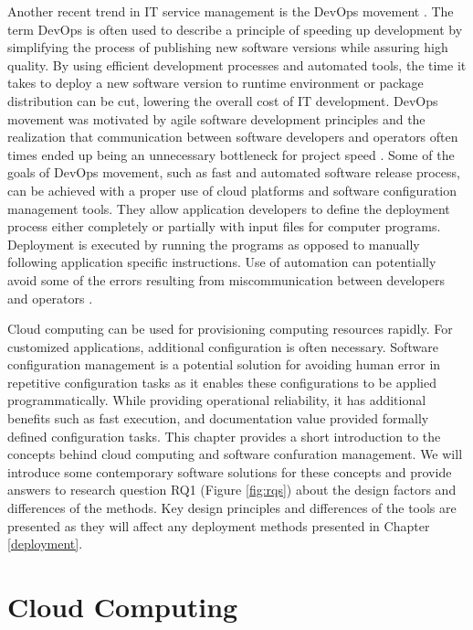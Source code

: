 Another recent trend in IT service management is the DevOps movement
\cite{wiedemann2019devops}. The term DevOps is often used to describe a
principle of speeding up development by simplifying the process of publishing
new software versions while assuring high quality. By using efficient
development processes and automated tools, the time it takes to deploy a new
software version to runtime environment or package distribution can be cut,
lowering the overall cost of IT development. DevOps movement was motivated by
agile software development principles and the realization that communication
between software developers and operators often times ended up being an
unnecessary bottleneck for project speed \cite{ebert2016devops}. Some of the
goals of DevOps movement, such as fast and automated software release process,
can be achieved with a proper use of cloud platforms and software configuration
management tools. They allow application developers to define the deployment
process either completely or partially with input files for computer programs.
Deployment is executed by running the programs as opposed to manually following
application specific instructions. Use of automation can potentially avoid some
of the errors resulting from miscommunication between developers and operators
\cite{ebert2016devops}.

Cloud computing can be used for provisioning computing resources rapidly. For
customized applications, additional configuration is often necessary. Software
configuration management is a potential solution for avoiding human error in
repetitive configuration tasks as it enables these configurations to be applied
programmatically. While providing operational reliability, it has additional
benefits such as fast execution, and documentation value provided formally
defined configuration tasks. This chapter provides a short introduction to the
concepts behind cloud computing and software confuration management. We will
introduce some contemporary software solutions for these concepts and provide
answers to research question RQ1 (Figure \ref{fig:rqs}) about the design
factors and differences of the methods. Key design principles and differences
of the tools are presented as they will affect any deployment methods presented
in Chapter \ref{deployment}.

\section{Cloud Computing} \label{cloud-computing}

